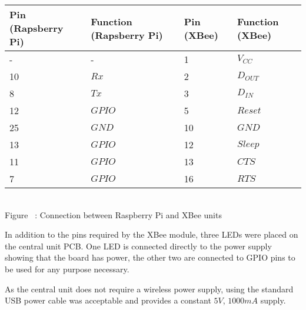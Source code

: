 \begin{center}
  \begin{tabular}{| l | l | l | l |}
    \hline
    \bf{Pin (Rapsberry Pi)} & \bf{Function (Rapsberry Pi)} & \bf{Pin (XBee)} & \bf{Function (XBee)} \\ \hline
     - & - & 1 & \(V_{CC}\) \\ \hline
	10 & \(Rx\) & 2 & \(D_{OUT}\) \\ \hline
	8 & \(Tx\) & 3 & \(D_{IN}\) \\ \hline
	12 & \(GPIO\) & 5 & \(Reset\) \\ \hline
	25 & \(GND\) & 10 & \(GND\) \\ \hline
	13 & \(GPIO\) & 12 & \(Sleep\) \\ \hline
	11 & \(GPIO\) & 13 & \(CTS\) \\ \hline
	7 & \(GPIO\) & 16 & \(RTS\) \\
    \hline
  \end{tabular}
\label{interfacePiXBee}\\
Figure ~: Connection between Raspberry Pi and XBee units
\end{center}


In addition to the pins required by the XBee module, three LEDs were placed on the central unit PCB. One LED is connected directly to the power supply showing that the board has power, the other two are connected to GPIO pins to be used for any purpose necessary.

As the central unit does not require a wireless power supply, using the standard USB power cable was acceptable and provides a constant $5\unit{V}$, $1000\unit{mA}$ supply.
